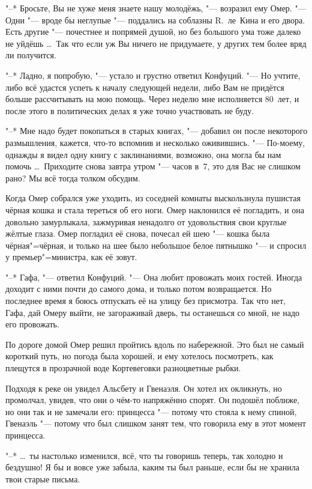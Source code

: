 "--* Бросьте, Вы не хуже меня знаете нашу молодёжь, "--- возразил ему Омер.
"--- Одни "--- вроде бы неглупые "--- поддались на соблазны R.~ле~Кина и его
двора.
Есть другие "--- почестнее и попрямей душой, но без большого ума тоже далеко не
уйдёшь \ldots\
Так что если уж Вы ничего не придумаете, у других тем более вряд ли получится.

"--* Ладно, я попробую, "--- устало и грустно ответил Конфуций.
"--- Но учтите, либо всё удастся успеть к началу следующей недели, либо Вам не
придётся больше рассчитывать на мою помощь.
Через неделю мне исполняется 80~лет, и после этого в политических делах я уже
точно участвовать не буду.

"--* Мне надо будет покопаться в старых книгах, "--- добавил он после некоторого
размышления, кажется, что-то вспомнив и несколько оживившись.
"--- По-моему, однажды я видел одну книгу с заклинаниями, возможно, она могла бы
нам помочь \ldots\
Приходите снова завтра утром "--- часов в~7, это для Вас не слишком рано?
Мы всё тогда толком обсудим.

Когда Омер собрался уже уходить, из соседней комнаты выскользнула пушистая
чёрная кошка и стала тереться об его ноги.
Омер наклонился её погладить, и она довольно замурлыкала, зажмуривая ненадолго
от удовольствия свои круглые жёлтые глаза.
Омер погладил её снова, почесал ей шею "--- кошка была чёрная"=чёрная, и только
на шее было небольшое белое пятнышко "--- и спросил у премьер"=министра, как её
зовут.

"--* Гафа, "--- ответил Конфуций.
"--- Она любит провожать моих гостей.
Иногда доходит с ними почти до самого дома, и только потом возвращается.
Но последнее время я боюсь отпускать её на улицу без присмотра.
Так что нет, Гафа, дай Омеру выйти, не загораживай дверь, ты останешься со мной,
не надо его провожать.

По дороге домой Омер решил пройтись вдоль по набережной.
Это был не самый короткий путь, но погода была хорошей, и ему хотелось
посмотреть, как плещутся в прозрачной воде Кортевеговки разноцветные рыбки.

Подходя к реке он увидел Альсбету и Гвенаэля.
Он хотел их окликнуть, но промолчал, увидев, что они о чём-то напряжённо спорят.
Он подошёл поближе, но они так и не замечали его: принцесса "--- потому что
стояла к нему спиной, Гвенаэль "--- потому что был слишком занят тем, что
говорила ему в этот момент принцесса.

"--* \ldots\ ты настолько изменился, всё, что ты говоришь теперь, так холодно
и бездушно!
Я бы и вовсе уже забыла, каким ты был раньше, если бы не хранила твои старые
письма.

